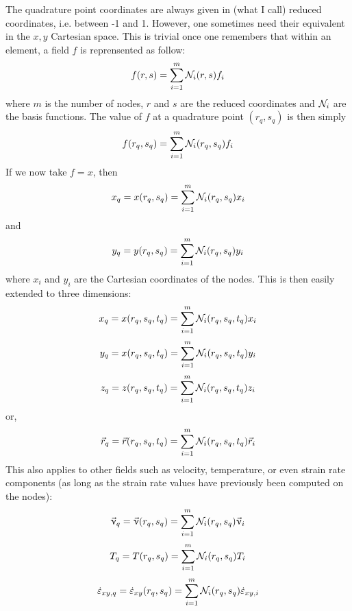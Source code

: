 The quadrature point coordinates are always given in (what I call) reduced coordinates, i.e. between 
-1 and 1.
However, one sometimes need their equivalent in the $x,y$ Cartesian space. 
This is trivial once one remembers that within an element, a field $f$ is reprensented 
as follow:
\[
f(r,s) = \sum_{i=1}^{m} {\mathcal{N}}_{i}(r,s) f_i
\]
where $m$ is the number of nodes, $r$ and $s$ are the reduced coordinates 
and ${\mathcal{N}}_i$ are the basis functions. 
The value of $f$ at a quadrature point $(r_q,s_q)$ is then simply
\[
f(r_q,s_q) = \sum_{i=1}^{m} {\mathcal{N}}_{i}(r_q,s_q) f_i
\]
If we now take $f=x$, then
\[
x_q =x(r_q,s_q) = \sum_{i=1}^{m} {\mathcal{N}}_{i}(r_q,s_q) x_i
\]
and
\[
y_q =y(r_q,s_q) = \sum_{i=1}^{m} {\mathcal{N}}_{i}(r_q,s_q) y_i
\]
where $x_i$ and $y_i$ are the Cartesian coordinates of the nodes.
This is then easily extended to three dimensions:
\[
x_q =x(r_q,s_q,t_q) = \sum_{i=1}^{m} {\mathcal{N}}_{i}(r_q,s_q,t_q) x_i
\]
\[
y_q =x(r_q,s_q,t_q) = \sum_{i=1}^{m} {\mathcal{N}}_{i}(r_q,s_q,t_q) y_i
\]
\[
z_q =z(r_q,s_q,t_q) = \sum_{i=1}^{m} {\mathcal{N}}_{i}(r_q,s_q,t_q) z_i
\]
or, 
\[
\vec{r}_q =\vec{r}(r_q,s_q,t_q) = \sum_{i=1}^{m} {\mathcal{N}}_{i}(r_q,s_q,t_q) \vec{r}_i
\]
This also applies to other fields such as velocity, temperature, or even strain rate components 
(as long as the strain rate values have previously been computed on the nodes): 
\[
\vec{\upnu}_q =\vec{\upnu}(r_q,s_q) = \sum_{i=1}^{m} {\mathcal{N}}_{i}(r_q,s_q) \vec{\upnu}_i
\]
\[
T_q =T(r_q,s_q) = \sum_{i=1}^{m} {\mathcal{N}}_{i}(r_q,s_q) T_i
\]
\[
\dot{\varepsilon}_{xy,q} 
= \dot{\varepsilon}_{xy} (r_q,s_q) = \sum_{i=1}^{m} {\mathcal{N}}_{i}(r_q,s_q)  \dot{\varepsilon}_{xy,i}
\]













